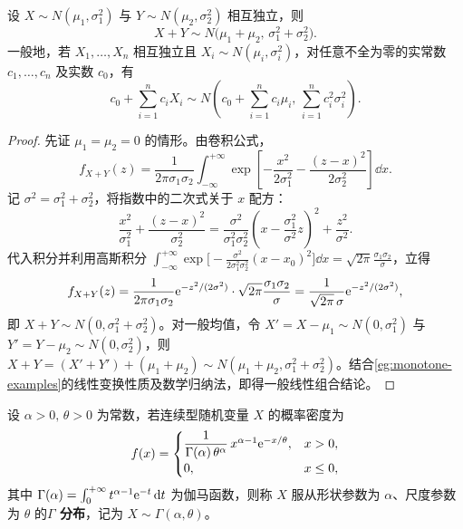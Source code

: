 \begin{proposition}[独立正态随机变量的线性组合]
\label{prop:independent-normal-linear}
设 $X\sim N(\mu_1,\sigma_1^2)$ 与 $Y\sim N(\mu_2,\sigma_2^2)$ 相互独立，则
\begin{equation}
  X+Y\sim N\bigl(\mu_1+\mu_2,\,\sigma_1^2+\sigma_2^2\bigr).
  \label{eq:normal-additivity}
\end{equation}
一般地，若 $X_1,\ldots,X_n$ 相互独立且 $X_i\sim N(\mu_i,\sigma_i^2)$，对任意不全为零的实常数 $c_1,\ldots,c_n$ 及实数 $c_0$，有
\[
  c_0+\sum_{i=1}^{n}c_i X_i\sim N\left(c_0+\sum_{i=1}^{n}c_i\mu_i,\,\sum_{i=1}^{n}c_i^2\sigma_i^2\right).
\]
\end{proposition}
\begin{proof}
先证 $\mu_1=\mu_2=0$ 的情形。由卷积公式，
\[
  f_{X+Y}(z)=\frac{1}{2\pi\sigma_1\sigma_2}
  \int_{-\infty}^{+\infty}\exp\left[-\frac{x^2}{2\sigma_1^2}-\frac{(z-x)^2}{2\sigma_2^2}\right]\dd x.
\]
记 $\sigma^2=\sigma_1^2+\sigma_2^2$，将指数中的二次式关于 $x$ 配方：
\[
  \frac{x^2}{\sigma_1^2}+\frac{(z-x)^2}{\sigma_2^2}
  =\frac{\sigma^2}{\sigma_1^2\sigma_2^2}\left(x-\frac{\sigma_1^2}{\sigma^2}z\right)^2
  +\frac{z^2}{\sigma^2}.
\]
代入积分并利用高斯积分 $\int_{-\infty}^{+\infty}\exp\bigl[-\frac{\sigma^2}{2\sigma_1^2\sigma_2^2}(x-x_0)^2\bigr]\dd x=\sqrt{2\pi}\frac{\sigma_1\sigma_2}{\sigma}$，立得
\[
  f_{X+Y}(z)=\frac{1}{2\pi\sigma_1\sigma_2}\mathrm{e}^{-z^2/(2\sigma^2)}\cdot\sqrt{2\pi}\frac{\sigma_1\sigma_2}{\sigma}
  =\frac{1}{\sqrt{2\pi}\,\sigma}\mathrm{e}^{-z^2/(2\sigma^2)},
\]
即 $X+Y\sim N(0,\sigma_1^2+\sigma_2^2)$。对一般均值，令 $X'=X-\mu_1\sim N(0,\sigma_1^2)$ 与 $Y'=Y-\mu_2\sim N(0,\sigma_2^2)$，则 $X+Y=(X'+Y')+(\mu_1+\mu_2)\sim N(\mu_1+\mu_2,\sigma_1^2+\sigma_2^2)$。结合\cref{eg:monotone-examples}的线性变换性质及数学归纳法，即得一般线性组合结论。
\end{proof}

\begin{definition}[$\Gamma$ 分布]
\label{def:gamma-distribution}
设 $\alpha>0,\,\theta>0$ 为常数，若连续型随机变量 $X$ 的概率密度为
\begin{equation}
  f(x)=
  \begin{cases}
    \dfrac{1}{\Gamma(\alpha)\,\theta^\alpha}\,x^{\alpha-1}\mathrm{e}^{-x/\theta},& x>0,\\
    0,& x\le 0,
  \end{cases}
  \label{eq:gamma-density}
\end{equation}
其中 $\Gamma(\alpha)=\int_{0}^{+\infty}t^{\alpha-1}\mathrm{e}^{-t}\mathop{}\!\mathrm{d} t$ 为伽马函数，则称 $X$ 服从形状参数为 $\alpha$、尺度参数为 $\theta$ 的\textbf{$\Gamma$ 分布}，记为 $X\sim\Gamma(\alpha,\theta)$。
\end{definition}

